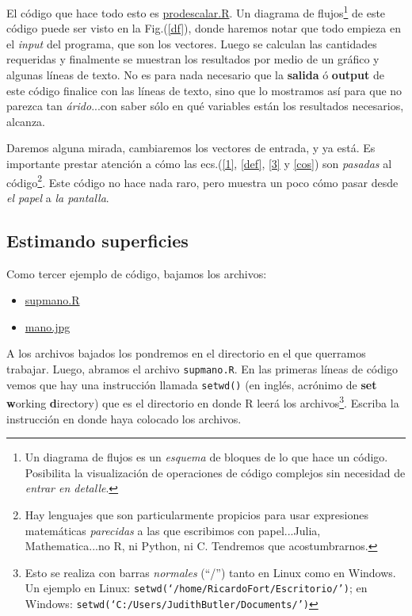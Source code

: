 \documentclass[11pt,a4paper]{article}
\begin{document}
El código que hace todo esto es \href{http://linux1.unsl.edu.ar/~mdolz/Experimental_I_2do_cuatrimestre/Programacion_R/}{prodescalar.R}. Un diagrama de flujos\footnote{Un diagrama de flujos es un \textit{esquema} de bloques de lo que hace un código. Posibilita la visualización de operaciones de código complejos sin necesidad de \textit{entrar en detalle}.} de este código puede ser visto en la Fig.(\ref{df}), donde haremos notar que todo empieza en el \textit{input} del programa, que son los vectores. Luego se calculan las cantidades requeridas y finalmente se muestran los resultados por medio de un gráfico y algunas líneas de texto. No es para nada necesario que la \textbf{salida} ó \textbf{output} de este código finalice con las líneas de texto, sino que lo mostramos así para que no parezca tan \textit{árido}...con saber sólo en qué variables están los resultados necesarios, alcanza.


Daremos alguna mirada, cambiaremos los vectores de entrada, y ya está. Es importante prestar atención a cómo las ecs.(\ref{1}, \ref{def}, \ref{3} y \ref{cos}) son \textit{pasadas} al código\footnote{Hay lenguajes que son particularmente propicios para usar expresiones matemáticas \textit{parecidas} a las que escribimos con papel...Julia, Mathematica...no R, ni Python, ni C. Tendremos que acostumbrarnos.}. Este código no hace nada raro, pero muestra un poco cómo pasar desde \textit{el papel} a \textit{la pantalla}.

 \subsection{Estimando superficies}

Como tercer ejemplo de código, bajamos los archivos:
\begin{itemize}
\item[$\bullet$] \href{http://linux1.unsl.edu.ar/~mdolz/Experimental_I_2do_cuatrimestre/Programacion_R/}{supmano.R} \item[$\bullet$] \href{http://linux1.unsl.edu.ar/~mdolz/Experimental_I_2do_cuatrimestre/Programacion_R/}{mano.jpg}
\end{itemize}

A los archivos bajados los pondremos en el directorio en el que querramos trabajar. Luego, abramos el archivo \texttt{supmano.R}. En las primeras líneas de código vemos que hay una instrucción llamada \texttt{setwd()} (en inglés, acrónimo de \textbf{set} \textbf{w}orking \textbf{d}irectory) que es el directorio en donde R leerá los archivos\footnote{Esto se realiza con barras \textit{normales} (``/'') tanto en Linux como en Windows. Un ejemplo en Linux: \texttt{setwd(`/home/RicardoFort/Escritorio/')}; en Windows: \texttt{setwd(`C:/Users/JudithButler/Documents/')}}. Escriba la instrucción en donde haya colocado los archivos.
\end{document}

